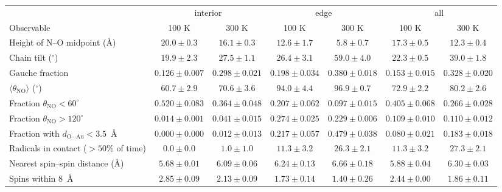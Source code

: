 \begin{tabular}{lcccccc}
\toprule
 & \multicolumn{2}{c}{interior} & \multicolumn{2}{c}{edge} & \multicolumn{2}{c}{all}\\
Observable & 100 K & 300 K & 100 K & 300 K & 100 K & 300 K\\
\midrule
Height of N--O midpoint (\AA) & $20.0\pm0.3$ & $16.1\pm0.3$ & $12.6\pm1.7$ & $5.8\pm0.7$ & $17.3\pm0.5$ & $12.3\pm0.4$\\
Chain tilt ($^\circ$) & $19.9\pm2.3$ & $27.5\pm1.1$ & $26.4\pm3.1$ & $59.0\pm4.0$ & $22.3\pm0.5$ & $39.0\pm1.8$\\
Gauche fraction & $0.126\pm0.007$ & $0.298\pm0.021$ & $0.198\pm0.034$ & $0.380\pm0.018$ & $0.153\pm0.015$ & $0.328\pm0.020$\\
$\langle\theta_\mathrm{NO}\rangle$ ($^\circ$) & $60.7\pm2.9$ & $70.6\pm3.6$ & $94.0\pm4.4$ & $96.9\pm0.7$ & $72.9\pm2.2$ & $80.2\pm2.6$\\
Fraction $\theta_\mathrm{NO}<60^\circ$ & $0.520\pm0.083$ & $0.364\pm0.048$ & $0.207\pm0.062$ & $0.097\pm0.015$ & $0.405\pm0.068$ & $0.266\pm0.028$\\
Fraction $\theta_\mathrm{NO}>120^\circ$ & $0.014\pm0.001$ & $0.041\pm0.015$ & $0.274\pm0.025$ & $0.229\pm0.006$ & $0.109\pm0.010$ & $0.110\pm0.012$\\
Fraction with $d_\mathrm{O\cdots Au}<3.5$~\AA & $0.000\pm0.000$ & $0.012\pm0.013$ & $0.217\pm0.057$ & $0.479\pm0.038$ & $0.080\pm0.021$ & $0.183\pm0.018$\\
Radicals in contact ($>50\%$ of time) & $0.0\pm0.0$ & $1.0\pm1.0$ & $11.3\pm3.2$ & $26.3\pm2.1$ & $11.3\pm3.2$ & $27.3\pm2.1$\\
Nearest spin--spin distance (\AA) & $5.68\pm0.01$ & $6.09\pm0.06$ & $6.24\pm0.13$ & $6.66\pm0.18$ & $5.88\pm0.04$ & $6.30\pm0.03$\\
Spins within 8~\AA & $2.85\pm0.09$ & $2.13\pm0.09$ & $1.73\pm0.14$ & $1.40\pm0.26$ & $2.44\pm0.00$ & $1.86\pm0.11$\\
\bottomrule
\end{tabular}
